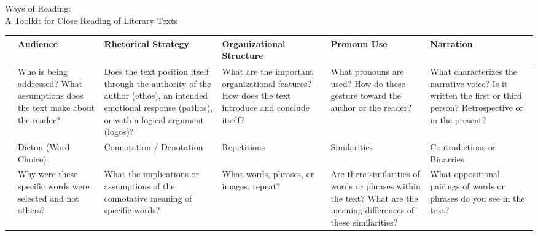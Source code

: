 \documentclass[12pt]{article}
\begin{document}
\begin{center}
\Large{Ways of Reading: \\
A Toolkit for Close Reading of Literary Texts}
\end{center}

\begin{table}[ht]
\centering

\begin{tabular}{| p{2mm} | p{1.75in} | p{1.75in} | p{1.75in} | p{1.75in} | p{1.75in}|}
\hline
\rowcolor[gray]{0.8}
&
Audience & 
Rhetorical Strategy & 
Organizational Structure & 
Pronoun Use & 
Narration \\ \hline
\centering\parbox[t]{2mm}{} &
Who is being addressed? What assumptions does the text make about the reader? &
Does the text position itself through the authority of the author (ethos), an intended emotional response (pathos), or with a logical argument (logos)? &
What are the important organizational features? How does the text introduce and conclude itself? &
What pronouns are used? How do these gesture toward the author or the reader? &
What characterizes the narrative voice? Is it written the first or third
person? Retrospective or in the present? \\ 

\hline 
{}
&
Dicton (Word-Choice) &
Connotation / Denotation &
Repetitions &
Similarities &
Contradictions or Binarries \\ 
\hline

\centering\parbox[t]{2mm}{} &
Why were these specific words were selected and not others? &
What the implications or assumptions of the connotative meaning of specific words? &
What words, phrases, or images, repeat? &
Are there similarities of words or phrases within the text? What are the
meaning differences of these similarities? &
What oppositional pairings of words or phrases do you see in the text? \\ 
\hline

%
%
%



\end{tabular}
\end{table}
\end{document}
